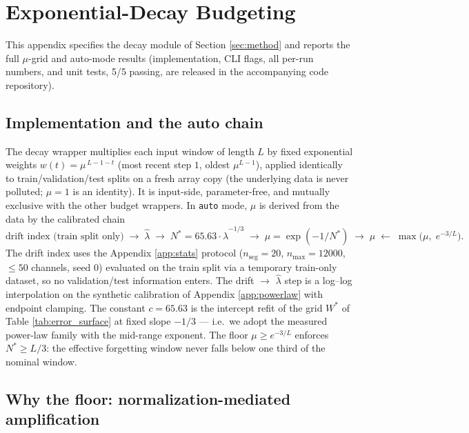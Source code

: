 \section{Exponential-Decay Budgeting}
\label{app:decay}

This appendix specifies the decay module of Section \ref{sec:method} and reports the full $\mu$-grid and auto-mode results (implementation, CLI flags, all per-run numbers, and unit tests, 5/5 passing, are released in the accompanying code repository).



\subsection{Implementation and the auto chain}

The decay wrapper multiplies each input window of length $L$ by fixed exponential weights $w(t) = \mu^{\,L-1-t}$ (most recent step $1$, oldest $\mu^{L-1}$), applied identically to train/validation/test splits on a fresh array copy (the underlying data is never polluted; $\mu{=}1$ is an identity). It is input-side, parameter-free, and mutually exclusive with the other budget wrappers. In \texttt{auto} mode, $\mu$ is derived from the data by the calibrated chain
\begin{equation}
\text{drift index (train split only)} \;\longrightarrow\; \hat{\lambda} \;\longrightarrow\; N^* = 65.63 \cdot \hat{\lambda}^{-1/3} \;\longrightarrow\; \mu = \exp(-1/N^*) \;\longrightarrow\; \mu \;\leftarrow\; \max\big(\mu,\; e^{-3/L}\big) .
\end{equation}
The drift index uses the Appendix \ref{app:stats} protocol ($n_{\mathrm{seg}}{=}20$, $n_{\max}{=}12000$, $\le 50$ channels, seed 0) evaluated on the train split via a temporary train-only dataset, so no validation/test information enters. The drift $\to$ $\hat{\lambda}$ step is a log--log interpolation on the synthetic calibration of Appendix \ref{app:powerlaw} with endpoint clamping. The constant $c = 65.63$ is the intercept refit of the grid $W^*$ of Table \ref{tab:error_surface} at fixed slope $-1/3$ --- i.e.\ we adopt the measured power-law family with the mid-range exponent. The floor $\mu \ge e^{-3/L}$ enforces $N^* \ge L/3$: the effective forgetting window never falls below one third of the nominal window.

\subsection{Why the floor: normalization-mediated amplification}

